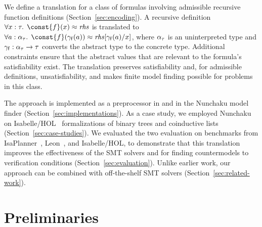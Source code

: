 We define a translation for a class of
formulas involving admissible recursive function definitions
(Section~\ref{sec:encoding}). A
recursive definition $\forall x : \tau.\;\, \const{f}(x) \teq \mathit{rhs}$
is translated to
$\forall a :
\fargtype{\tau}.\;\, \const{f}(\farg{\con{f}}(a)) \teq \mathit{rhs}[\farg{\con{f}}(a)/x]$, where
$\alpha_{\tau}$ is an uninterpreted  type and $\gamma_{\mathsf{f}} :
\alpha_{\tau} \to \tau$ converts the abstract type to the concrete
type. Additional constraints ensure that the abstract values that are relevant
to the formula's satisfiability
exist. The translation preserves satisfiability and, for admissible definitions,
unsatisfiability, and makes finite model finding possible for problems in this
class.

The approach is implemented as a preprocessor in \cvc and in the Nunchaku
model finder (Section~\ref{sec:implementations}). As a case study, we employed
Nunchaku on Isabelle/HOL~\cite{nipkow-et-al-2002} formalizations of binary
trees and coinductive lists (Section~\ref{sec:case-studies}).
%
We evaluated the two evaluation on benchmarks from
IsaPlanner~\cite{DBLP:conf/itp/JohanssonDB10}, Leon~\cite{blanc2013overview},
and Isabelle/HOL, to demonstrate that this translation improves the
effectiveness of the SMT solvers \cvc and \ziii for finding countermodels to
verification conditions (Section~\ref{sec:evaluation}). Unlike earlier work,
our approach can be combined with off-the-shelf SMT solvers
(Section~\ref{sec:related-work}).


\section{Preliminaries}
\label{sec:prelim}

